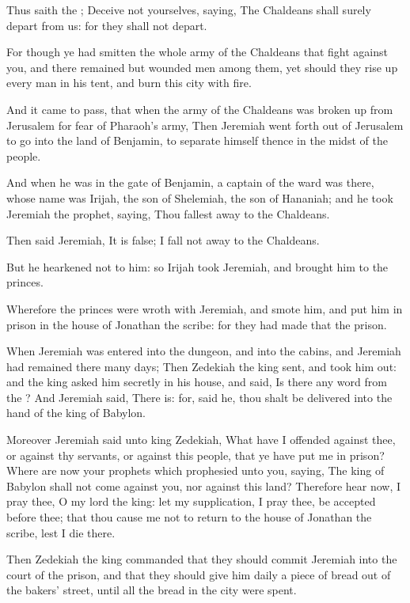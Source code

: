 \verse Thus saith the \LORD; Deceive not yourselves, saying, The Chaldeans shall surely depart from us: for they shall not depart.

\verse For though ye had smitten the whole army of the Chaldeans that fight against you, and there remained but wounded men among them, yet should they rise up every man in his tent, and burn this city with fire.

\verse And it came to pass, that when the army of the Chaldeans was broken up from Jerusalem for fear of Pharaoh's army, \verse Then Jeremiah went forth out of Jerusalem to go into the land of Benjamin, to separate himself thence in the midst of the people.

\verse And when he was in the gate of Benjamin, a captain of the ward was there, whose name was Irijah, the son of Shelemiah, the son of Hananiah; and he took Jeremiah the prophet, saying, Thou fallest away to the Chaldeans.

\verse Then said Jeremiah, It is false; I fall not away to the Chaldeans.

But he hearkened not to him: so Irijah took Jeremiah, and brought him to the princes.

\verse Wherefore the princes were wroth with Jeremiah, and smote him, and put him in prison in the house of Jonathan the scribe: for they had made that the prison.

\verse When Jeremiah was entered into the dungeon, and into the cabins, and Jeremiah had remained there many days; \verse Then Zedekiah the king sent, and took him out: and the king asked him secretly in his house, and said, Is there any word from the \LORD? And Jeremiah said, There is: for, said he, thou shalt be delivered into the hand of the king of Babylon.

\verse Moreover Jeremiah said unto king Zedekiah, What have I offended against thee, or against thy servants, or against this people, that ye have put me in prison?  \verse Where are now your prophets which prophesied unto you, saying, The king of Babylon shall not come against you, nor against this land?  \verse Therefore hear now, I pray thee, O my lord the king: let my supplication, I pray thee, be accepted before thee; that thou cause me not to return to the house of Jonathan the scribe, lest I die there.

\verse Then Zedekiah the king commanded that they should commit Jeremiah into the court of the prison, and that they should give him daily a piece of bread out of the bakers' street, until all the bread in the city were spent.

